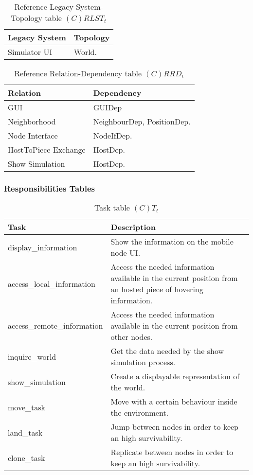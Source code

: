 \begin{table}[H]
	\centering
	\begin{tabular}{|p{4cm}|p{8cm}|}
			\hline
			\textbf{Legacy System} & \textbf{Topology} \\
			\hline
			Simulator UI & World. \\
			\hline
		\end{tabular}
	\caption{Reference Legacy System-Topology table $(C)RLST_t$}
	\label{tab:crlsTt}
\end{table}

\begin{table}[H]
	\centering
	\begin{tabular}{|p{4cm}|p{8cm}|}
			\hline
			\textbf{Relation} & \textbf{Dependency} \\
			\hline
			GUI & GUIDep \\
			\hline
			Neighborhood & NeighbourDep, PositionDep. \\
			\hline
			Node Interface & NodeIfDep. \\
			\hline
			HostToPiece Exchange & HostDep. \\
			\hline
			Show Simulation & HostDep. \\
			\hline
		\end{tabular}
	\caption{Reference Relation-Dependency table $(C)RRD_t$}
	\label{tab:crrdt}
\end{table}

\subsubsection{Responsibilities Tables}

\begin{table}[H]
	\centering
	\begin{tabular}{|p{5cm}|p{7cm}|}
			\hline
			\textbf{Task} & \textbf{Description} \\
			\hline
			display\_information & Show the information on the mobile node UI.\\
			\hline
			access\_local\_information & Access the needed information available in the
			current position from an hosted piece of hovering information.\\
			\hline
			access\_remote\_information & Access the needed information available in the
			current position from other nodes.\\
			\hline
			inquire\_world & Get the data needed by the show simulation process.  \\
			\hline
			show\_simulation & Create a displayable representation of the world. \\
			\hline
			move\_task & Move with a certain behaviour inside the environment. \\
			\hline
			land\_task & Jump between nodes in order to keep an high survivability. \\
			\hline
			clone\_task & Replicate between nodes in order to keep an high survivability. \\
			\hline
		\end{tabular}
	\caption{Task table $(C)T_t$}
	\label{tab:ctt}
\end{table}

